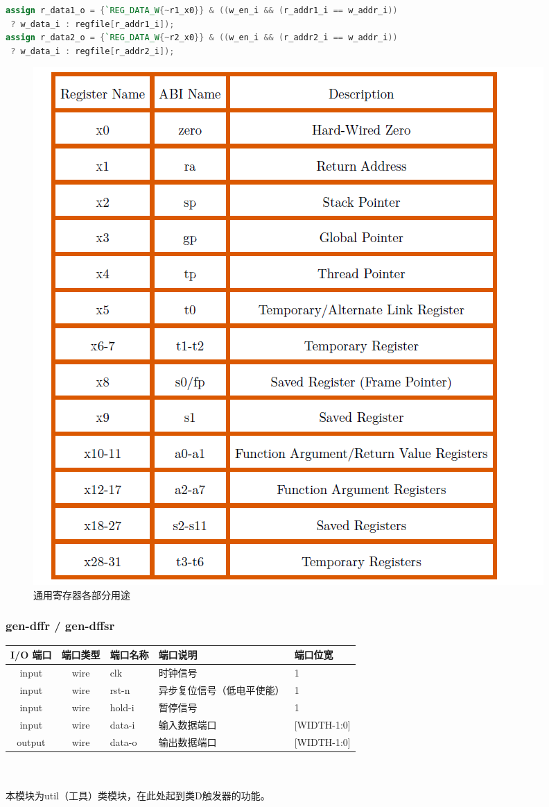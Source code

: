 \documentclass[lang=cn,11pt,a4paper]{elegantpaper}
\begin{document}
\begin{lstlisting}[language=verilog]
assign r_data1_o = {`REG_DATA_W{~r1_x0}} & ((w_en_i && (r_addr1_i == w_addr_i))
 ? w_data_i : regfile[r_addr1_i]);
assign r_data2_o = {`REG_DATA_W{~r2_x0}} & ((w_en_i && (r_addr2_i == w_addr_i))
 ? w_data_i : regfile[r_addr2_i]);

\end{lstlisting}
\begin{figure}
	\centering
	\includegraphics[width=0.7\linewidth]{1640076105(1)}
	\caption{通用寄存器各部分用途}
	\label{fig:16400761051}
\end{figure}

\subsubsection{gen-dffr / gen-dffsr }
\begin{tabular}{cclll}
	\toprule
	I/O 端口 & 端口类型 &端口名称&端口说明 &端口位宽\\
	\midrule
	input &wire& clk & 时钟信号 & 1 \\
	input &wire& rst-n & 异步复位信号（低电平使能） & 1 \\
	input &wire& hold-i & 暂停信号       & 1   \\
	input &wire& data-i  & 输入数据端口 & [WIDTH-1:0]  \\

	output &wire& data-o  & 输出数据端口 & [WIDTH-1:0]  \\
	\bottomrule
\end{tabular}\\
\\
本模块为util（工具）类模块，在此处起到类D触发器的功能。
\end{document}
